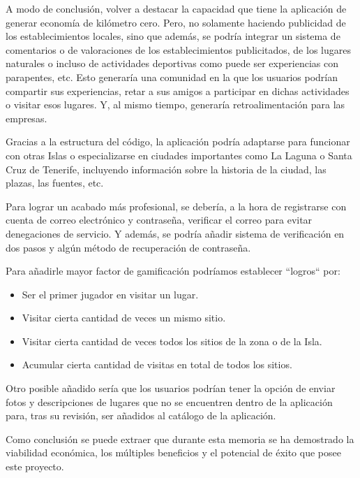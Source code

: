 A modo de conclusión, volver a destacar la capacidad que tiene la aplicación de generar economía de kilómetro cero. Pero, no solamente haciendo publicidad de los establecimientos locales, sino que además, se podría integrar un sistema de comentarios o de valoraciones de los establecimientos publicitados, de los lugares naturales o incluso de actividades deportivas como puede ser experiencias con parapentes, etc. Esto generaría una comunidad en la que los usuarios podrían compartir sus experiencias, retar a sus amigos a participar en dichas actividades o visitar esos lugares. Y, al mismo tiempo, generaría retroalimentación para las empresas.

Gracias a la estructura del código, la aplicación podría adaptarse para funcionar con otras Islas o especializarse en ciudades importantes como La Laguna o Santa Cruz de Tenerife, incluyendo información sobre la historia de la ciudad, las plazas, las fuentes, etc.

Para lograr un acabado más profesional, se debería, a la hora de registrarse con cuenta de correo electrónico y contraseña, verificar el correo para evitar denegaciones de servicio. Y además, se podría añadir sistema de verificación en dos pasos y algún método de recuperación de contraseña.

Para añadirle mayor factor de gamificación podríamos establecer ``logros`` por:
\begin{itemize}
\item Ser el primer jugador en visitar un lugar.
\item Visitar cierta cantidad de veces un mismo sitio.
\item Visitar cierta cantidad de veces todos los sitios de la zona o de la Isla.
\item Acumular cierta cantidad de visitas en total de todos los sitios.
\end{itemize}

Otro posible añadido sería que los usuarios podrían tener la opción de enviar fotos y descripciones de lugares que no se encuentren dentro de la aplicación para, tras su revisión, ser añadidos al catálogo de la aplicación.

Como conclusión se puede extraer que durante esta memoria se ha demostrado la viabilidad económica, los múltiples beneficios y el potencial de éxito que posee este proyecto.